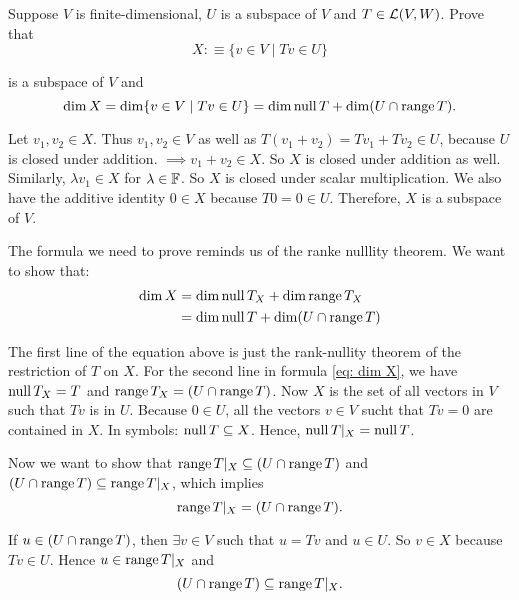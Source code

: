 \begin{xrcs}
  Suppose $V$ is finite-dimensional, $U$ is a subspace  of $V$ and $T \in \mathcal{L} (V,W)$. Prove that
  \begin{equation}
    X :\equiv \{v  \in V \mid Tv \in U \}
  \end{equation}

  is a subspace of $V$ and
  \begin{equation}
    \dim X = \dim \{v \in V \mid Tv \in U \} = \dim \operatorname{null} T + \dim (U \cap \operatorname{range} T).
  \end{equation}

  \begin{xprf}
    Let $v_1, v_2 \in X$. Thus $v_1, v_2 \in V$ as well as $T(v_1 + v_2) = T v_1 + T v_2 \in U$, because $U$ is closed under addition. $\implies v_1 + v_2 \in X$. So $X$ is closed under addition as well. Similarly, $\lambda v_1 \in X$ for $\lambda \in \mathbb{F}$. So $X$ is closed under scalar multiplication. We also have the additive identity $0 \in X$ because $T0=0\in U$. Therefore, $X$ is a subspace of $V$.

    The formula we need to prove reminds us of the ranke nulllity theorem. We want to show that:
    \begin{equation}
      \label{eq: dim X}
      \begin{aligned}
        \dim X &= \dim \operatorname{null} T_X + \dim \operatorname{range} T_X \\
        &= \dim \operatorname{null} T + \dim (U \cap \operatorname{range} T)
      \end{aligned}
    \end{equation}

    The first line of the equation above is just the rank-nullity theorem of the restriction of $T$ on $X$. For the second line in formula \eqref{eq: dim X}, we have $\mynull T_X = \null T$ and
    $\operatorname{range} T_X = (U \cap \operatorname{range} T)$. Now $X$ is the set of all vectors in $V$ such that $Tv$ is in $U$. Because $0 \in U$, all the vectors $v \in V$ sucht that $Tv=0$ are contained in $X$. In symbols: $\operatorname{null} T \subseteq X$. Hence, $\operatorname{null} T|_X = \operatorname{null} T$.

    Now we want to show that $\operatorname{range} T|_X \subseteq (U \cap \operatorname{range} T)$ and $(U \cap \operatorname{range} T) \subseteq \operatorname{range} T|_X$, which implies
    \begin{equation}
      \operatorname{range} T|_X = (U \cap \operatorname{range} T).
    \end{equation}

    If $u \in (U \cap \operatorname{range} T)$, then $\exists v \in V$ such that $u=Tv$ and $u \in U$. So $v \in X$ because $Tv \in U$. Hence $u \in \operatorname{range} T|_X$ and
    \begin{equation}
      (U \cap \operatorname{range} T) \subseteq \operatorname{range} T|_X.
    \end{equation}


\end{xprf}
\end{xrcs}
